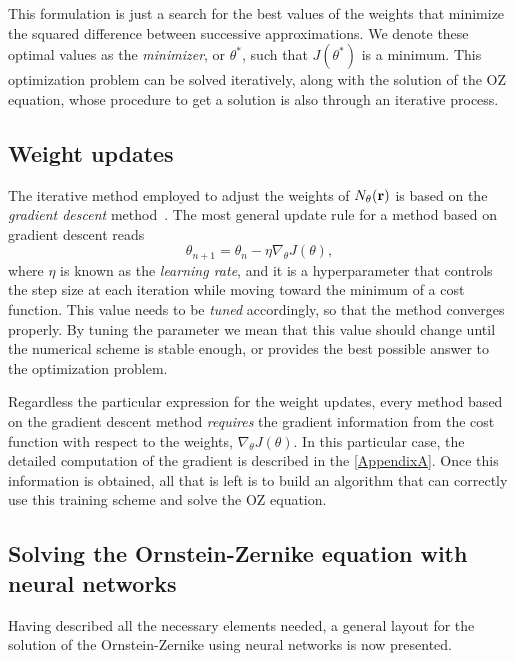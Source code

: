 This formulation is just a search for the best values of the weights that minimize
the squared difference between successive approximations. We denote these optimal values
as the \emph{minimizer}, or $\theta^{*}$, such that $J(\theta^{*})$ is a minimum.
This optimization problem can be solved iteratively, along with the solution of the
OZ equation, whose procedure to get a solution is also through an iterative process.

\subsection{Weight updates}
The iterative method employed to adjust the weights of $N_{\theta}(\mathbf{r})$ is based on the
\emph{gradient descent} method~\cite{nocedalNumericalOptimization2006}.
The most general update rule for a method based on gradient descent reads~\cite{goodfellowDeepLearning2016}
\begin{equation}
    \theta_{n+1} = \theta_n - \eta \nabla_{\theta} J(\theta) ,
    \label{eq:gradiente}
\end{equation}
where $\eta$ is known as the \emph{learning rate}, and it is a hyperparameter
that controls the step size at each iteration while moving toward the minimum
of a cost function. This value needs to be \emph{tuned} accordingly, so
that the method converges properly. By tuning the parameter we mean that this value
should change until the numerical scheme is stable enough, or provides the best
possible answer to the optimization problem.

Regardless the particular expression for the weight updates, every method
based on the gradient descent method \emph{requires} the gradient information from
the cost function with respect to the weights, $\nabla_{\theta} J(\theta)$.
In this particular case, the detailed computation of the gradient is described in
the \autoref{AppendixA}.
Once this information is obtained, all that is left is to build an algorithm that
can correctly use this training scheme and solve the OZ equation.

\subsection{Solving the Ornstein-Zernike equation with neural networks}
\label{subsec:oz-solution}

Having described all the necessary elements needed, a general layout for the solution
of the Ornstein-Zernike using neural networks is now presented.

